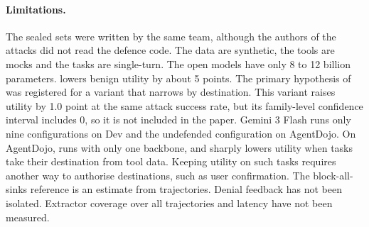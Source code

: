 \paragraph{Limitations.} The sealed sets were written by the same team, although the authors of the attacks did not
read the defence code. The data are synthetic, the tools are mocks and the tasks are single-turn. The open models have
only 8 to 12 billion parameters. \ours{} lowers benign utility by about 5 points. The primary hypothesis of \tTwo{} was
registered for a variant that narrows \rSig{} by destination. This variant raises utility by 1.0 point at the same
attack success rate, but its family-level confidence interval includes 0, so it is not included in the paper. Gemini 3
Flash runs only nine configurations on Dev and the undefended configuration on AgentDojo. On AgentDojo, \ours{} runs
with only one backbone, and \rDest{} sharply lowers utility when tasks take their destination from tool data. Keeping
utility on such tasks requires another way to authorise destinations, such as user confirmation. The block-all-sinks
reference is an estimate from trajectories. Denial feedback has not been isolated. Extractor coverage over all
trajectories and latency have not been measured.
